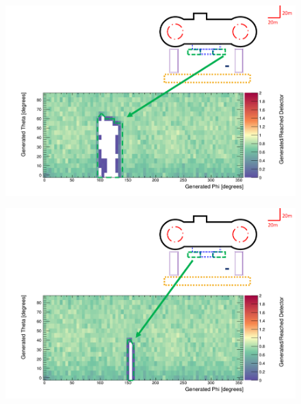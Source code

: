 \begin{figure}[htbp]
 \centering
 \includegraphics[width=\linewidth]{Chapter5/Figs/wylfaRasterNew/serviceTowerCloseGen_Reached.png}
 \label{fig:serviceTowerCloseGen_Reached}
\end{figure}

\begin{figure}[htbp]
 \centering
 \includegraphics[width=\linewidth]{Chapter5/Figs/wylfaRasterNew/serviceTowerFarGen_Reached.png}
 \label{fig:serviceTowerFarGen_Reached}
\end{figure}

